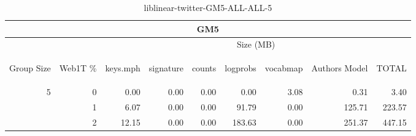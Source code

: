 \begin{center}
\begin{table}[htbp] 
 \begin{center}
\begin{tabular}{ | r | r | r | r | r | r | r | r | r |}
\hline
\multicolumn{9}{|c|}{GM5}\\
\hline
 & & \multicolumn{7}{|c|}{Size (MB)}\\ \cline{3-9}
\begin{sideways}Group Size\end{sideways} & \begin{sideways}Web1T \% \end{sideways} & \begin{sideways}keys.mph\end{sideways} & \begin{sideways}signature\end{sideways} & \begin{sideways}counts\end{sideways} & \begin{sideways}logprobs\end{sideways} & \begin{sideways}vocabmap\end{sideways} & \begin{sideways}Authors Model \end{sideways} & \begin{sideways}TOTAL\end{sideways}\\
\hline
\multirow{2}{*}{5}
 & 0 & 0.00 & 0.00 & 0.00 & 0.00 & 3.08 & 0.31 & 3.40\\ \cline{2-9}
 & 1 & 6.07 & 0.00 & 0.00 & 91.79 & 0.00 & 125.71 & 223.57\\ \cline{2-9}
 & 2 & 12.15 & 0.00 & 0.00 & 183.63 & 0.00 & 251.37 & 447.15\\ \cline{2-9}
\hline
\end{tabular}
\caption{liblinear-twitter-GM5-ALL-ALL-5}
\label{table:liblinear-twitter-GM5-ALL-ALL-5}
\end{center}
 \end{table}
\end{center}

